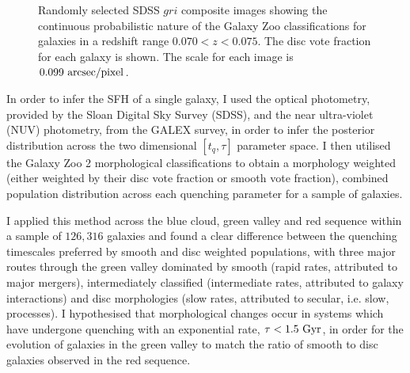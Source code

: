 \documentclass[12pt, usenatbib]{article}
\begin{document}
\begin{figure}[t]
\caption{Randomly selected SDSS $gri$ composite images showing the continuous probabilistic nature of the Galaxy Zoo classifications for galaxies in a redshift range $0.070 < z < 0.075$. The disc vote fraction for each galaxy is shown. The scale for each image is $0.099~\rm{arcsec/pixel}$.}
\label{fig:mosaic}
\end{figure}

In order to infer the SFH of a single galaxy, I used the optical photometry, provided by the Sloan Digital Sky Survey (SDSS), and the near ultra-violet (NUV) photometry, from the GALEX survey, in order to infer the posterior distribution across the two dimensional $[t_q, \tau]$ parameter space. I then utilised the Galaxy Zoo 2 morphological classifications to obtain a morphology weighted (either weighted by their disc vote fraction or smooth vote fraction), combined population distribution across each quenching parameter for a sample of galaxies. 

I applied this method across the blue cloud, green valley and red sequence within a sample of $126,316$ galaxies and found a clear difference between the quenching timescales preferred by smooth and disc weighted populations, with three major routes through the green valley dominated by smooth (rapid rates, attributed to major mergers), intermediately classified (intermediate rates, attributed to galaxy interactions) and disc morphologies (slow rates, attributed to secular, i.e. slow, processes). I hypothesised that morphological changes occur in systems which have undergone quenching with an exponential rate, $\tau < 1.5~\rm{Gyr}$, in order for the evolution of galaxies in the green valley to match the ratio of smooth to disc galaxies observed in the red sequence.
\end{document}
